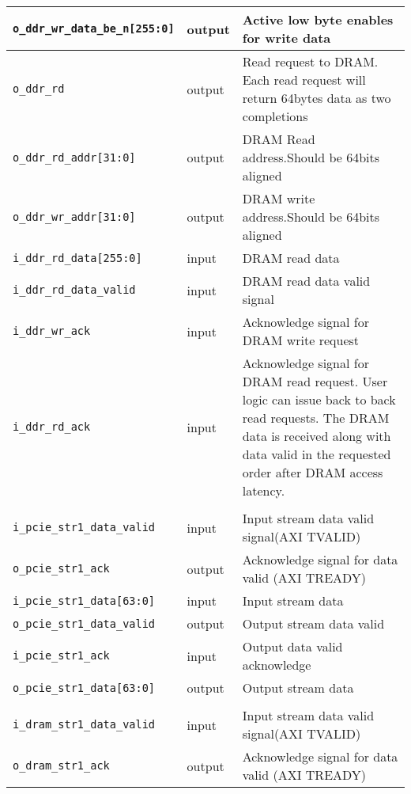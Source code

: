 \begin{longtable}{|l|l|p{9cm}|}
    {\texttt{o\_ddr\_wr\_data\_be\_n[255:0]}} & output & Active low byte enables for write data\\\hline
    {\texttt{o\_ddr\_rd}}         &  output         &  Read request to DRAM. Each read request will return 64bytes data as two completions\\\hline
    {\texttt{o\_ddr\_rd\_addr[31:0]}} &  output     &  DRAM Read address.Should be 64bits aligned\\\hline
    {\texttt{o\_ddr\_wr\_addr[31:0]}} &  output     &  DRAM write address.Should be 64bits aligned\\\hline
    {\texttt{i\_ddr\_rd\_data[255:0]}} & input      &  DRAM read data\\\hline
    {\texttt{i\_ddr\_rd\_data\_valid}} & input      &  DRAM read data valid signal\\\hline
    {\texttt{i\_ddr\_wr\_ack}}         & input      &  Acknowledge signal for DRAM write request\\\hline
    {\texttt{i\_ddr\_rd\_ack}}         & input      &  Acknowledge signal for DRAM read request. User logic can issue back to back read requests. The DRAM data is received along with data valid in the requested order after DRAM access latency.\\\hline
    \rowcolor[gray]{0.9}
    \multicolumn{2}{|l}{USER PCIe stream interface} &             \\\hline        
    {\texttt{i\_pcie\_str1\_data\_valid}}  & input  & Input stream data valid signal(AXI TVALID)\\\hline
    {\texttt{o\_pcie\_str1\_ack        }} & output & Acknowledge signal for data valid (AXI TREADY)\\\hline
    {\texttt{i\_pcie\_str1\_data[63:0] }} & input  & Input stream data\\\hline
    {\texttt{o\_pcie\_str1\_data\_valid}} & output & Output stream data valid\\\hline
    {\texttt{i\_pcie\_str1\_ack        }} & input  & Output data valid acknowledge\\\hline
    {\texttt{o\_pcie\_str1\_data[63:0] }} & output & Output stream data\\\hline
    \rowcolor[gray]{0.9}
    \multicolumn{2}{|l}{USER DRAM stream interface} &             \\\hline        
    {\texttt{i\_dram\_str1\_data\_valid }} & input  & Input stream data valid signal(AXI TVALID)\\\hline
    {\texttt{o\_dram\_str1\_ack         }} & output & Acknowledge signal for data valid (AXI TREADY)\\\hline

\end{longtable}
